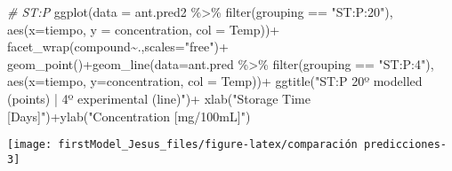 \documentclass[
]{article}
\newenvironment{Shaded}{\begin{snugshade}}{\end{snugshade}}
\newcommand{\AttributeTok}[1]{\textcolor[rgb]{0.77,0.63,0.00}{#1}}
\newcommand{\CommentTok}[1]{\textcolor[rgb]{0.56,0.35,0.01}{\textit{#1}}}
\newcommand{\FunctionTok}[1]{\textcolor[rgb]{0.00,0.00,0.00}{#1}}
\newcommand{\NormalTok}[1]{#1}
\newcommand{\SpecialCharTok}[1]{\textcolor[rgb]{0.00,0.00,0.00}{#1}}
\newcommand{\StringTok}[1]{\textcolor[rgb]{0.31,0.60,0.02}{#1}}
\begin{document}
\begin{Shaded}
\begin{Highlighting}[]
\CommentTok{\# ST:P}
\FunctionTok{ggplot}\NormalTok{(}\AttributeTok{data =}\NormalTok{ ant.pred2 }\SpecialCharTok{\%\textgreater{}\%} \FunctionTok{filter}\NormalTok{(grouping }\SpecialCharTok{==} \StringTok{"ST:P:20"}\NormalTok{), }\FunctionTok{aes}\NormalTok{(}\AttributeTok{x=}\NormalTok{tiempo, }\AttributeTok{y =}\NormalTok{ concentration, }\AttributeTok{col =}\NormalTok{ Temp))}\SpecialCharTok{+}
  \FunctionTok{facet\_wrap}\NormalTok{(compound}\SpecialCharTok{\textasciitilde{}}\NormalTok{.,}\AttributeTok{scales=}\StringTok{"free"}\NormalTok{)}\SpecialCharTok{+}
  \FunctionTok{geom\_point}\NormalTok{()}\SpecialCharTok{+}\FunctionTok{geom\_line}\NormalTok{(}\AttributeTok{data=}\NormalTok{ant.pred }\SpecialCharTok{\%\textgreater{}\%} \FunctionTok{filter}\NormalTok{(grouping }\SpecialCharTok{==} \StringTok{"ST:P:4"}\NormalTok{), }\FunctionTok{aes}\NormalTok{(}\AttributeTok{x=}\NormalTok{tiempo, }\AttributeTok{y=}\NormalTok{concentration, }\AttributeTok{col =}\NormalTok{ Temp))}\SpecialCharTok{+}
  \FunctionTok{ggtitle}\NormalTok{(}\StringTok{"ST:P 20º modelled (points) | 4º experimental (line)"}\NormalTok{)}\SpecialCharTok{+} \FunctionTok{xlab}\NormalTok{(}\StringTok{"Storage Time [Days]"}\NormalTok{)}\SpecialCharTok{+}\FunctionTok{ylab}\NormalTok{(}\StringTok{"Concentration [mg/100mL]"}\NormalTok{)}
\end{Highlighting}
\end{Shaded}

\begin{center}\texttt{[image: firstModel\_Jesus\_files/figure-latex/comparación predicciones-3]} \end{center}
\end{document}
